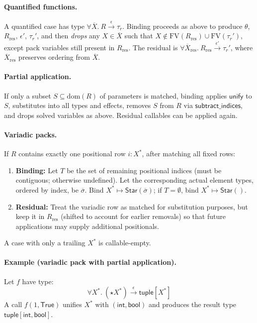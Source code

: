 \paragraph{Quantified functions.}
A quantified case has type $\forall\overline{X}.~R \xrightarrow{\epsilon} \tau_r$.
Binding proceeds as above to produce $\theta$, $R_{\mathrm{res}}$, $\epsilon'$, $\tau_r'$,
and then \emph{drops} any $X\in\overline{X}$ such that $X\not\in \mathrm{FV}(R_{\mathrm{res}})\cup \mathrm{FV}(\tau_r')$,
except pack variables still present in $R_{\mathrm{res}}$.
The residual is $\forall\overline{X}_{\mathrm{res}}.~R_{\mathrm{res}} \xrightarrow{\epsilon'} \tau_r'$,
where $\overline{X}_{\mathrm{res}}$ preserves ordering from $\overline{X}$.

\paragraph{Partial application.}
If only a subset $S \subseteq \mathrm{dom}(R)$ of parameters is matched,
binding applies $\mathsf{unify}$ to $S$, substitutes into all types and effects,
removes $S$ from $R$ via $\mathsf{subtract\_indices}$, and drops solved variables as above.
Residual callables can be applied again.

\paragraph{Variadic packs.}
If $R$ contains exactly one positional row $i:X^*$, after matching all fixed rows:
\begin{enumerate}
    \item \textbf{Binding:} Let $T$ be the set of remaining positional indices (must be contiguous; otherwise undefined).
          Let the corresponding actual element types, ordered by index, be $\overline{\sigma}$.
          Bind $X^* \mapsto \mathsf{Star}(\overline{\sigma})$; if $T=\emptyset$, bind $X^* \mapsto \mathsf{Star}()$.
    \item \textbf{Residual:} Treat the variadic row as matched for substitution purposes,
          but keep it in $R_{\mathrm{res}}$ (shifted to account for earlier removals) so that
          future applications may supply additional positionals.
\end{enumerate}
A case with only a trailing $X^*$ is callable-empty.

\paragraph{Example (variadic pack with partial application).}
Let $f$ have type:
\[
\forall X^*. \ (\star X^*) \xrightarrow{\epsilon} \mathsf{tuple}[X^*]
\]
A call $f(1, \mathsf{True})$ unifies $X^*$ with $(\mathsf{int}, \mathsf{bool})$ and produces the result type $\mathsf{tuple}[\mathsf{int}, \mathsf{bool}]$.

